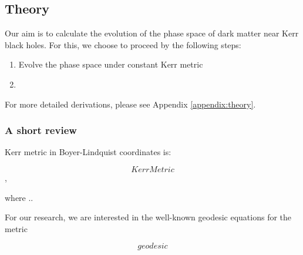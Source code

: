 \documentclass[a4paper,10pt]{article}
\begin{document}
\subsection{Theory}


Our aim is to calculate the evolution of the phase space of dark matter near Kerr black holes. For this, we choose to proceed by the 
following steps:

\begin{enumerate}
 \item Evolve the phase space under constant Kerr metric
 \item 
\end{enumerate}


For more detailed derivations, please see Appendix \ref{appendix:theory}.

\subsubsection{A short review}

% 
% 
% 



Kerr metric in Boyer-Lindquist coordinates is:

\begin{equation}
 KerrMetric
\end{equation},

where ..

For our research, we are interested in the well-known geodesic equations for the metric 


\begin{equation}
 geodesic
\end{equation}
\end{document}
